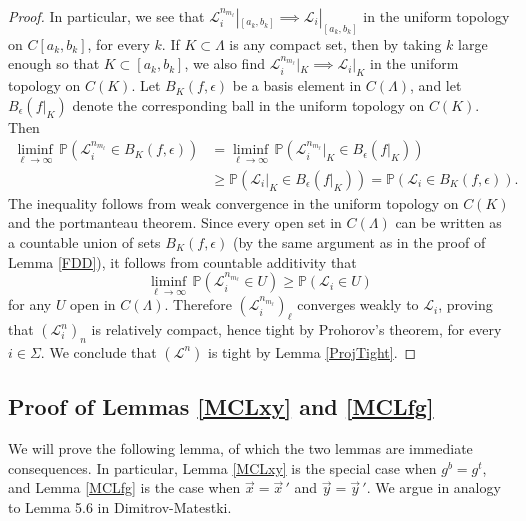 \begin{proof}
In particular, we see that $\mathcal{L}_i^{n_{m_\ell}}|_{[a_k,b_k]} \implies \mathcal{L}_i|_{[a_k,b_k]}$ in the uniform topology on $C[a_k,b_k]$, for every $k$. If $K\subset\Lambda$ is any compact set, then by taking $k$ large enough so that $K\subset [a_k,b_k]$, we also find $\mathcal{L}_i^{n_{m_\ell}}|_K \implies \mathcal{L}_i|_K$ in the uniform topology on $C(K)$. Let $B_K(f,\epsilon)$ be a basis element in $C(\Lambda)$, and let $B_\epsilon(f|_K)$ denote the corresponding ball in the uniform topology on $C(K)$. Then
\begin{align*}
\liminf_{\ell\to\infty}\,\mathbb{P}(\mathcal{L}^{n_{m_\ell}}_i \in B_K(f,\epsilon)) &= \liminf_{\ell\to\infty}\,\mathbb{P}(\mathcal{L}^{n_{m_\ell}}_i|_K \in B_\epsilon(f|_K))\\
&\geq \mathbb{P}(\mathcal{L}_i|_K \in B_\epsilon(f|_K)) = \mathbb{P}(\mathcal{L}_i \in B_K(f,\epsilon)).
\end{align*}
The inequality follows from weak convergence in the uniform topology on $C(K)$ and the portmanteau theorem. Since every open set in $C(\Lambda)$ can be written as a countable union of sets $B_K(f,\epsilon)$ (by the same argument as in the proof of Lemma \ref{FDD}), it follows from countable additivity that
\[
\liminf_{\ell\to\infty}\,\mathbb{P}(\mathcal{L}^{n_{m_\ell}}_i \in U) \geq \mathbb{P}(\mathcal{L}_i \in U)
\]
for any $U$ open in $C(\Lambda)$. Therefore $(\mathcal{L}_i^{n_{m_\ell}})_\ell$ converges weakly to $\mathcal{L}_i$, proving that $(\mathcal{L}^n_i)_n$ is relatively compact, hence tight by Prohorov's theorem, for every $i\in\Sigma$. We conclude that $(\mathcal{L}^n)$ is tight by Lemma \ref{ProjTight}.

\end{proof}


\subsection{Proof of Lemmas \ref{MCLxy} and \ref{MCLfg}}

We will prove the following lemma, of which the two lemmas are immediate consequences. In particular, Lemma \ref{MCLxy} is the special case when $g^b = g^t$, and Lemma \ref{MCLfg} is the case when $\vec{x} = \vec{x}\,'$ and $\vec{y} = \vec{y}\,'$. We argue in analogy to Lemma 5.6 in Dimitrov-Matestki.


